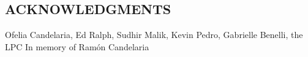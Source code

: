 


\vspace*{2in}
\begin{center}
\emph{\blindtext} %
\end{center}

\newpage


\vspace*{0.5in}
\begin{center}
\section*{ACKNOWLEDGMENTS}
\end{center}



Ofelia Candelaria, Ed Ralph, Sudhir Malik, Kevin Pedro, Gabrielle Benelli, the LPC \newline
In memory of Ramón Candelaria



